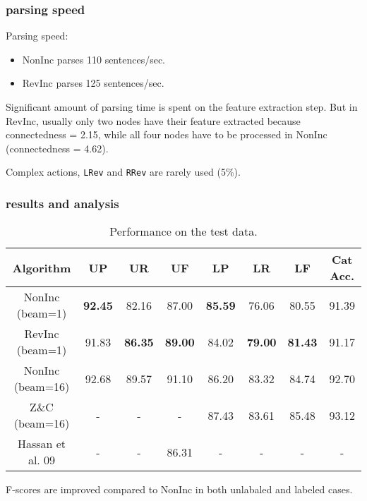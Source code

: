 \documentclass[10pt]{beamer}
\begin{document}
\begin{frame}
    \frametitle{parsing speed}
    Parsing speed:
    \begin{itemize}
        \item NonInc parses 110 sentences/sec.
        \item RevInc parses 125 sentences/sec.
    \end{itemize}

    \bigskip

    Significant amount of parsing time is spent on the feature extraction step.
    But in RevInc, usually only two nodes have their feature extracted because connectedness = 2.15,
    while all four nodes have to be processed in NonInc (connectedness = 4.62).

    \smallskip

    Complex actions, \texttt{LRev} and \texttt{RRev} are rarely used (5\%).
\end{frame}

\begin{frame}
    \frametitle{results and analysis}
    \begingroup
    \scriptsize
    \begin{center}
    \begin{table}
        \caption{Performance on the test data.}
        \begin{tabular}{cccccccc}
            \toprule
            Algorithm        & UP             & UR             & UF             & LP             & LR             & LF             & Cat Acc. \\
            \midrule
            NonInc (beam=1)  & \textbf{92.45} & 82.16          & 87.00          & \textbf{85.59} & 76.06          & 80.55          & 91.39 \\
            RevInc (beam=1)  & 91.83          & \textbf{86.35} & \textbf{89.00} & 84.02          & \textbf{79.00} & \textbf{81.43} & 91.17 \\
            \midrule
            NonInc (beam=16) & 92.68          & 89.57          & 91.10          & 86.20          & 83.32          & 84.74          & 92.70 \\
            Z\&C (beam=16)   & -              & -              & -              & 87.43          & 83.61          & 85.48          & 93.12 \\
            Hassan et al. 09 & -              & -              & 86.31          & -              & -              & -              & -     \\
            \bottomrule
        \end{tabular}
    \end{table}
    \end{center}
    \endgroup

     F-scores are improved compared to NonInc in both unlabaled and labeled cases.
\end{frame}
\end{document}

